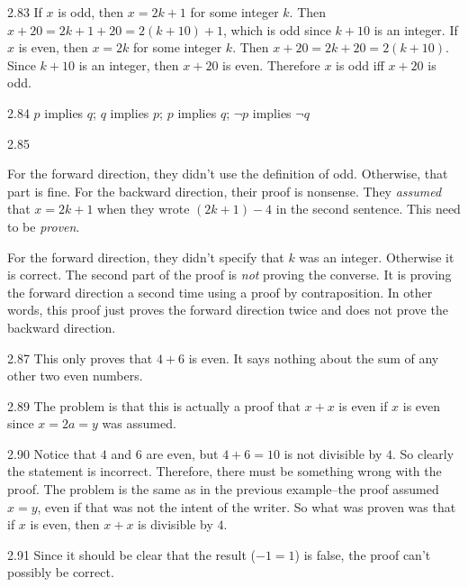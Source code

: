 \begin{Answer}{2.83}
If $x$ is odd, then $x=2k+1$ for some integer $k$.
Then $x+20=2k+1+20=2(k+10)+1$, which is odd since $k+10$ is an integer.
If $x$ is even, then $x=2k$ for some integer $k$.
Then $x+20=2k+20=2(k+10)$.  Since $k+10$ is an integer, then
$x+20$ is even. Therefore $x$ is odd iff $x+20$ is odd.
\end{Answer}
\begin{Answer}{2.84}
$p$ implies $q$;
$q$ implies $p$;
$p$ implies $q$;
$\neg p$ implies $\neg q$
\end{Answer}
\begin{Answer}{2.85}
\begin{pfevalenum}
\item
For the forward direction, they didn't use the definition of odd.  Otherwise, that part is fine.
For the backward direction, their proof is nonsense.  They {\em assumed} that $x=2k+1$ when they wrote
$(2k+1)-4$ in the second sentence.  This need to be {\em proven}.
\item
For the forward direction, they didn't specify that $k$ was an integer.  Otherwise it is correct.
The second part of the proof is {\em not} proving the converse.  It is proving the forward direction
a second time using a proof by contraposition.  In other words, this proof just proves the forward
direction twice and does not prove the backward direction.
\end{pfevalenum}
\end{Answer}
\begin{Answer}{2.87}
This only proves that $4+6$ is even. It says nothing about the sum of any other two even numbers.
\end{Answer}
\begin{Answer}{2.89}
The problem is that this is actually a proof that $x+x$ is even if $x$ is even since $x=2a=y$ was assumed.
\end{Answer}
\begin{Answer}{2.90}
Notice that $4$ and $6$ are even, but $4+6=10$ is not divisible by $4$.  So clearly the statement
is incorrect.  Therefore, there must be something wrong with the proof.
The problem is the same as in the previous example--the proof assumed $x=y$, even if that was
not the intent of the writer.  So what was proven was that if $x$ is even, then $x+x$ is divisible by $4$.
\end{Answer}
\begin{Answer}{2.91}
Since it should be clear that the result ($-1=1$) is false, the proof can't possibly be correct.
\end{Answer}
